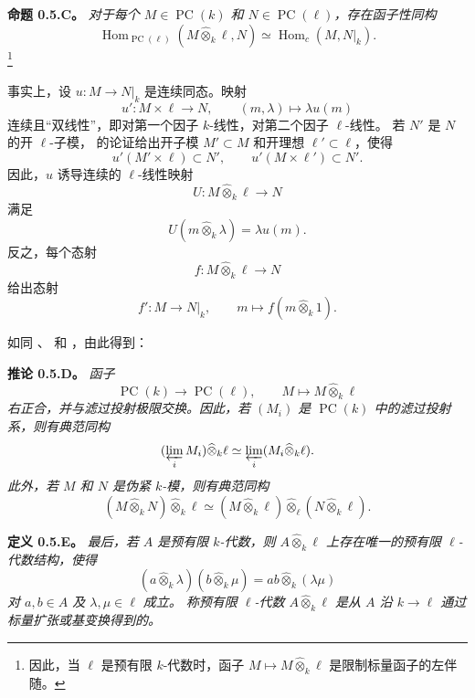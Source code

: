 \medskip
\noindent\textbf{命题 0.5.C。}
\label{sga3:VIIB:0.5.C}
\textit{对于每个 \(M\in\operatorname{PC}(k)\) 和
\(N\in\operatorname{PC}(\ell)\)，存在函子性同构}
\[
  \operatorname{Hom}_{\operatorname{PC}(\ell)}
    (M\widehat{\otimes}_k\ell,N)
  \simeq
  \operatorname{Hom}_c(M,N|_k).
\]
\footnote{因此，当 \(\ell\) 是预有限 \(k\)-代数时，函子
\(M\mapsto M\widehat{\otimes}_k\ell\) 是限制标量函子的左伴随。}

事实上，设 \(u:M\to N|_k\) 是连续同态。映射
\[
  u':M\times\ell\longrightarrow N,
  \qquad
  (m,\lambda)\longmapsto\lambda u(m)
\]
连续且“双线性”，即对第一个因子 \(k\)-线性，对第二个因子 \(\ell\)-线性。
若 \(N'\) 是 \(N\) 的开 \(\ell\)-子模，
的论证给出开子模 \(M'\subset M\) 和开理想 \(\ell'\subset\ell\)，使得
\[
  u'(M'\times\ell)\subset N',
  \qquad
  u'(M\times\ell')\subset N'.
\]
因此，\(u\) 诱导连续的 \(\ell\)-线性映射
\[
  U:M\widehat{\otimes}_k\ell\longrightarrow N
\]
满足
\[
  U(m\widehat{\otimes}_k\lambda)=\lambda u(m).
\]
反之，每个态射
\[
  f:M\widehat{\otimes}_k\ell\longrightarrow N
\]
给出态射
\[
  f':M\longrightarrow N|_k,
  \qquad
  m\longmapsto f(m\widehat{\otimes}_k1).
\]

如同 、 和 ，由此得到：

\medskip
\noindent\textbf{推论 0.5.D。}
\label{sga3:VIIB:0.5.D}
{\itshape 函子
\[
  \operatorname{PC}(k)\longrightarrow\operatorname{PC}(\ell),
  \qquad
  M\longmapsto M\widehat{\otimes}_k\ell
\]
右正合，并与滤过投射极限交换。因此，若 \((M_i)\) 是
\(\operatorname{PC}(k)\) 中的滤过投射系，则有典范同构
\[
  (\varprojlim_iM_i)\widehat{\otimes}_k\ell
  \simeq
  \varprojlim_i(M_i\widehat{\otimes}_k\ell).
\]
此外，若 \(M\) 和 \(N\) 是伪紧 \(k\)-模，则有典范同构
\[
  (M\widehat{\otimes}_kN)\widehat{\otimes}_k\ell
  \simeq
  (M\widehat{\otimes}_k\ell)
    \widehat{\otimes}_{\ell}
  (N\widehat{\otimes}_k\ell).
\]}

\medskip
\noindent\textbf{定义 0.5.E。}
\label{sga3:VIIB:0.5.E}
{\itshape 最后，若 \(A\) 是预有限 \(k\)-代数，则 \(A\widehat{\otimes}_k\ell\)
上存在唯一的预有限 \(\ell\)-代数结构，使得
\[
  (a\widehat{\otimes}_k\lambda)
  (b\widehat{\otimes}_k\mu)
  =
  ab\widehat{\otimes}_k(\lambda\mu)
\]
对 \(a,b\in A\) 及 \(\lambda,\mu\in\ell\) 成立。
称预有限 \(\ell\)-代数 \(A\widehat{\otimes}_k\ell\) 是从 \(A\) 沿
\(k\to\ell\) 通过标量扩张或基变换得到的。}

